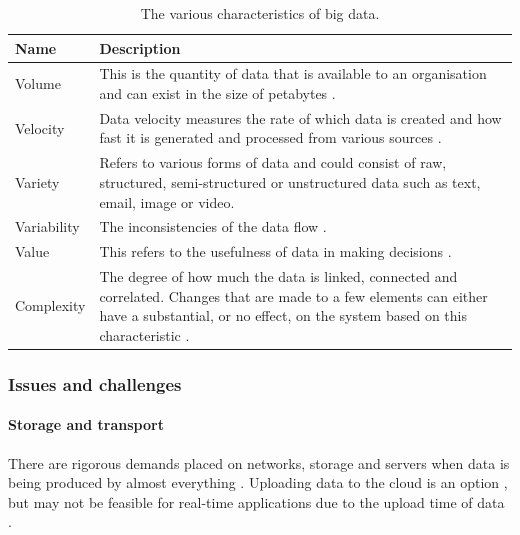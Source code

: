 \documentclass[a4paper]{article}
\begin{document}
{{{				\begin{table}[H]
				\caption{The various characteristics of big data.}
				\begin{tabularx}{\textwidth}{@{}lX@{}}
					\toprule
					\textbf{Name} & \textbf{Description} \\
					\midrule
					Volume & This is the quantity of data that is available to an organisation \citep{kaisler2013big} and can exist in the size of petabytes \citep{katal2013big}. \\
					Velocity & Data velocity measures the rate of which data is created \citep{ferguson2012architecting} and how fast it is generated and processed from various sources \citep{katal2013big}. \\
					Variety & Refers to various forms of data and could consist of raw, structured, semi-structured or unstructured data \citep{ferguson2012architecting} such as text, email, image or video. \\
					Variability & The inconsistencies of the data flow \citep{katal2013big}. \\
					Value & This refers to the usefulness of data in making decisions \citep{kaisler2013big}. \\
					Complexity & The degree of how much the data is linked, connected and correlated. Changes that are made to a few elements can either have a substantial, or no effect, on the system based on this characteristic \citep{kaisler2013big}. \\
					\bottomrule
				\end{tabularx}
				\end{table}
			
			}
			
			\subsubsection{Issues and challenges} {
				
				\paragraph{Storage and transport} {
				
					There are rigorous demands placed on networks, storage and servers when data is being produced by almost everything \citep{katal2013big}. Uploading data to the cloud is an option \citep{katal2013big} \citep{labrinidis2012challenges}, but may not be feasible for real-time applications due to the upload time of data \citep{katal2013big}. 
					
}}}}
\end{document}
